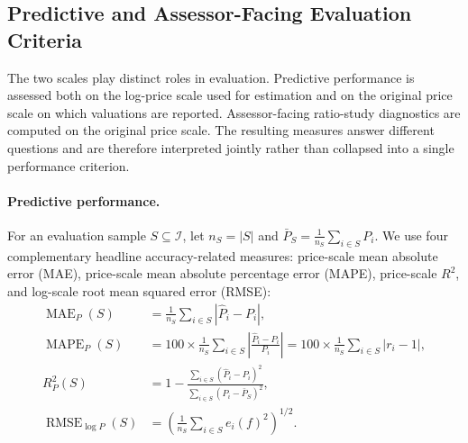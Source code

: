 \documentclass[10pt]{article}
\theoremstyle{definition}
\newcommand{\1}{\mathbf{1}}
\begin{document}
\subsection{Predictive and Assessor-Facing Evaluation Criteria}
\label{subsec:metrics}


{The two scales play distinct roles in evaluation. Predictive performance is assessed both on the log-price scale used for estimation and on the original price scale on which valuations are reported. Assessor-facing ratio-study diagnostics are computed on the original price scale. The resulting measures answer different questions and are therefore interpreted jointly rather than collapsed into a single performance criterion.}

\paragraph{Predictive performance.}
{For an evaluation sample $S\subseteq\mathcal{I}$, let $n_S=|S|$ and $\bar P_S=\frac{1}{n_S}\sum_{i\in S}P_i$. We use four complementary headline accuracy-related measures: price-scale mean absolute error (MAE), price-scale mean absolute percentage error (MAPE), price-scale $R^2$, and log-scale root mean squared error (RMSE):}
\begin{align}
\label{eq:predictive_metrics}
\operatorname{MAE}_{P}(S)
&=
\frac{1}{n_S}\sum_{i\in S}\left|\widehat P_i-P_i\right|,
\\
{\operatorname{MAPE}_{P}(S)}
&{=100\times
\frac{1}{n_S}
\sum_{i\in S}
\left|
\frac{\widehat P_i-P_i}{P_i}
\right|
=100\times 
\frac{1}{n_S}\sum_{i\in S}|r_i-1|},
\\
R^2_{P}(S)
&=
1-
\frac{\sum_{i\in S}(\widehat P_i-P_i)^2}
{\sum_{i\in S}(P_i-\bar P_S)^2},
\\
\operatorname{RMSE}_{\log P}(S)
&=
\left(
\frac{1}{n_S}\sum_{i\in S}e_i(f)^2
\right)^{1/2}.
\end{align}
\end{document}
